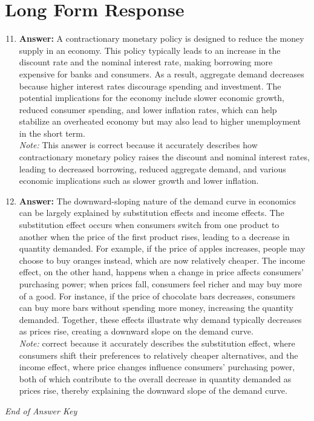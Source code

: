 \documentclass[12pt]{article}
\begin{document}
\section*{Long Form Response}
\begin{enumerate}[label=\arabic*.]
\setcounter{enumi}{10}
\item \textbf{Answer:} A contractionary monetary policy is designed to reduce the money supply in an economy. This policy typically leads to an increase in the discount rate and the nominal interest rate, making borrowing more expensive for banks and consumers. As a result, aggregate demand decreases because higher interest rates discourage spending and investment. The potential implications for the economy include slower economic growth, reduced consumer spending, and lower inflation rates, which can help stabilize an overheated economy but may also lead to higher unemployment in the short term.
\\ \textit{Note:} This answer is correct because it accurately describes how contractionary monetary policy raises the discount and nominal interest rates, leading to decreased borrowing, reduced aggregate demand, and various economic implications such as slower growth and lower inflation.
\item \textbf{Answer:} The downward-sloping nature of the demand curve in economics can be largely explained by substitution effects and income effects. The substitution effect occurs when consumers switch from one product to another when the price of the first product rises, leading to a decrease in quantity demanded. For example, if the price of apples increases, people may choose to buy oranges instead, which are now relatively cheaper. The income effect, on the other hand, happens when a change in price affects consumers' purchasing power; when prices fall, consumers feel richer and may buy more of a good. For instance, if the price of chocolate bars decreases, consumers can buy more bars without spending more money, increasing the quantity demanded. Together, these effects illustrate why demand typically decreases as prices rise, creating a downward slope on the demand curve.
\\ \textit{Note:} correct because it accurately describes the substitution effect, where consumers shift their preferences to relatively cheaper alternatives, and the income effect, where price changes influence consumers' purchasing power, both of which contribute to the overall decrease in quantity demanded as prices rise, thereby explaining the downward slope of the demand curve.
\end{enumerate}

\vfill
\noindent\textit{End of Answer Key}
\end{document}
